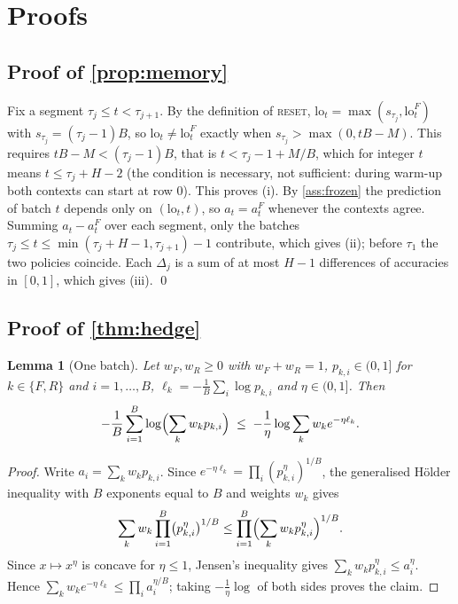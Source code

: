 \documentclass[10pt]{article}
\newtheorem{lemma}{Lemma}
\theoremstyle{definition}
\theoremstyle{remark}
\newcommand{\full}{\textup{\textsc{reset}}}
\begin{document}
\appendix

\section{Proofs}
\label{app:proofs}

\subsection{Proof of \cref{prop:memory}}
Fix a segment $\tau_j\le t<\tau_{j+1}$. By the definition of \full, $\mathrm{lo}_t=\max(s_{\tau_j},\mathrm{lo}^F_t)$ with
$s_{\tau_j}=(\tau_j-1)B$, so $\mathrm{lo}_t\ne\mathrm{lo}^F_t$ exactly when $s_{\tau_j}>\max(0,tB-M)$. This requires $tB-M<(\tau_j-1)B$, that is
$t<\tau_j-1+M/B$, which for integer $t$ means $t\le\tau_j+H-2$ (the condition is necessary, not sufficient: during warm-up both
contexts can start at row 0). This proves (i). By \cref{ass:frozen} the prediction
of batch $t$ depends only on $(\mathrm{lo}_t,t)$, so $a_t=a^F_t$ whenever the contexts agree. Summing $a_t-a^F_t$ over
each segment, only the batches $\tau_j\le t\le\min(\tau_j+H-1,\tau_{j+1})-1$ contribute, which gives (ii); before
$\tau_1$ the two policies coincide. Each $\Delta_j$ is a sum of at most $H-1$ differences of accuracies in $[0,1]$,
which gives (iii). \qed

\subsection{Proof of \cref{thm:hedge}}

\begin{lemma}[One batch]
\label{lem:batch}
Let $w_F,w_R\ge0$ with $w_F+w_R=1$, $p_{k,i}\in(0,1]$ for $k\in\{F,R\}$ and $i=1,\dots,B$, $\ell_k=-\frac1B\sum_i\log
p_{k,i}$ and $\eta\in(0,1]$. Then
\begin{equation}
  -\frac1B\sum_{i=1}^{B}\log\Bigl(\sum_k w_k p_{k,i}\Bigr)\;\le\;-\frac1\eta\log\sum_k w_k e^{-\eta\ell_k}.
\end{equation}
\end{lemma}

\begin{proof}
Write $a_i=\sum_k w_kp_{k,i}$. Since $e^{-\eta\ell_k}=\prod_i (p_{k,i}^{\eta})^{1/B}$, the generalised H\"older
inequality with $B$ exponents equal to $B$ and weights $w_k$ gives
\begin{equation}
  \sum_k w_k\prod_{i=1}^{B}\bigl(p_{k,i}^{\eta}\bigr)^{1/B}\le\prod_{i=1}^{B}\Bigl(\sum_k w_k p_{k,i}^{\eta}\Bigr)^{1/B}.
\end{equation}
Since $x\mapsto x^\eta$ is concave for $\eta\le1$, Jensen's inequality gives $\sum_k w_kp_{k,i}^{\eta}\le a_i^{\eta}$.
Hence $\sum_k w_ke^{-\eta\ell_k}\le\prod_i a_i^{\eta/B}$; taking $-\frac1\eta\log$ of both sides proves the claim.
\end{proof}
\end{document}
